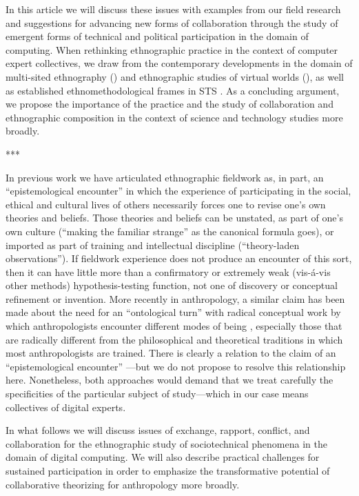 \documentclass[10pt,letter,oneside]{scrartcl}
\begin{document}
In this article we will discuss these issues with examples from our
field research and suggestions for advancing new forms of
collaboration through the study of emergent forms of technical and
political participation in the domain of computing.  When rethinking
ethnographic practice in the context of computer expert collectives,
we draw from the contemporary developments in the domain of
multi-sited ethnography
(\cite{Fischer1999,Marcus1995,Burrell2009,Falzonetal2009,Rabinow2008})
and ethnographic studies of virtual worlds
(\cite{BOELLSTORFF2008,Miller2001,HorstandMiller2012,BoestorffNardi2013}),
as well as established ethnomethodological frames in STS
\cite{Forsythe1999,forsythe2001studying,Latoour2007,Suchman1987,Suchman1999}.  As a concluding argument, we
propose the importance of the practice and the study of collaboration
and ethnographic composition \cite{Kelty2008a} in the context of
science and technology studies more broadly.

***

In previous work we have articulated ethnographic fieldwork as, in
part, an ``epistemological encounter'' \cite{Kelty2008} in which the
experience of participating in the social, ethical and cultural lives
of others necessarily forces one to revise one's own theories and
beliefs.  Those theories and beliefs can be unstated, as part of one's
own culture (``making the familiar strange'' as the canonical formula
goes), or imported as part of training and intellectual discipline
(``theory-laden observations'').  If fieldwork experience does not
produce an encounter of this sort, then it can have little more than a
confirmatory or extremely weak (vis-á-vis other methods)
hypothesis-testing function, not one of discovery or conceptual
refinement or invention.  More recently in anthropology, a similar
claim has been made about the need for an ``ontological turn'' with
radical conceptual work by which anthropologists encounter different
modes of being \cite{VdC,Latour,Kohn,Holmrad}, especially those that
are radically different from the philosophical and theoretical
traditions in which most anthropologists are trained.  There is
clearly a relation to the claim of an ``epistemological encounter''
---but we do not propose to resolve this relationship here.
Nonetheless, both approaches would demand that we treat carefully the
specificities of the particular subject of study---which in our case
means collectives of digital experts.

In what follows we will discuss issues of exchange, rapport, conflict,
and collaboration for the ethnographic study of sociotechnical
phenomena in the domain of digital computing. We will also describe
practical challenges for sustained participation in order to emphasize
the transformative potential of collaborative theorizing for
anthropology more broadly.
\end{document}
